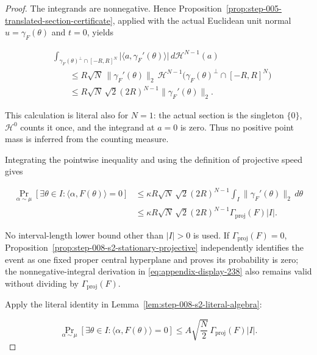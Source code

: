 \begin{proof}
The integrands are nonnegative. Hence Proposition~\ref{prop:step-005-translated-section-certificate}, applied with the actual Euclidean unit normal
\(u=\gamma_F(\theta)\) and \(t=0\), yields

\begin{equation}
\label{eq:appendix-display-237}
\begin{aligned}
&\int_{\gamma_F(\theta)^\perp\cap[-R,R]^N}
\lvert\langle a,\gamma_F'(\theta)\rangle\rvert
\,d\mathcal H^{N-1}(a)\\
&\qquad\leq
R\sqrt N\,\lVert\gamma_F'(\theta)\rVert_2\,
\mathcal H^{N-1}
\bigl(\gamma_F(\theta)^\perp\cap[-R,R]^N\bigr)\\
&\qquad\leq
R\sqrt N\,\sqrt{2}(2R)^{N-1}
\lVert\gamma_F'(\theta)\rVert_2.
\end{aligned}
\end{equation}

This calculation is literal also for \(N=1\): the actual section is the singleton \(\{0\}\),
\(\mathcal H^0\) counts it once, and the integrand at \(a=0\) is zero. Thus no positive point mass is inferred
from the counting measure.

Integrating the pointwise inequality and using the definition of projective speed gives

\begin{equation}
\label{eq:appendix-display-238}
\begin{aligned}
\Pr_{\alpha\sim\mu}
[\exists\theta\in I:\langle\alpha,F(\theta)\rangle=0]
&\leq
\kappa R\sqrt N\,\sqrt{2}(2R)^{N-1}
\int_I\lVert\gamma_F'(\theta)\rVert_2\,d\theta\\
&\leq
\kappa R\sqrt N\,\sqrt{2}(2R)^{N-1}
\Gamma_{\mathrm{proj}}(F)\lvert I\rvert.
\end{aligned}
\end{equation}

No interval-length lower bound other than \(\lvert I\rvert>0\) is used. If
\(\Gamma_{\mathrm{proj}}(F)=0\), Proposition~\ref{prop:step-008-s2-stationary-projective} independently
identifies the event as one fixed proper central hyperplane and proves its probability is zero; the
nonnegative-integral derivation in \eqref{eq:appendix-display-238} also remains valid without dividing by
\(\Gamma_{\mathrm{proj}}(F)\).

Apply the literal identity in Lemma~\ref{lem:step-008-s2-literal-algebra}:

\begin{equation}
\label{eq:appendix-display-239}
\Pr_{\alpha\sim\mu}
[\exists\theta\in I:\langle\alpha,F(\theta)\rangle=0]
\leq
A\sqrt{\frac N2}\,
\Gamma_{\mathrm{proj}}(F)\lvert I\rvert.
\end{equation}


\end{proof}
